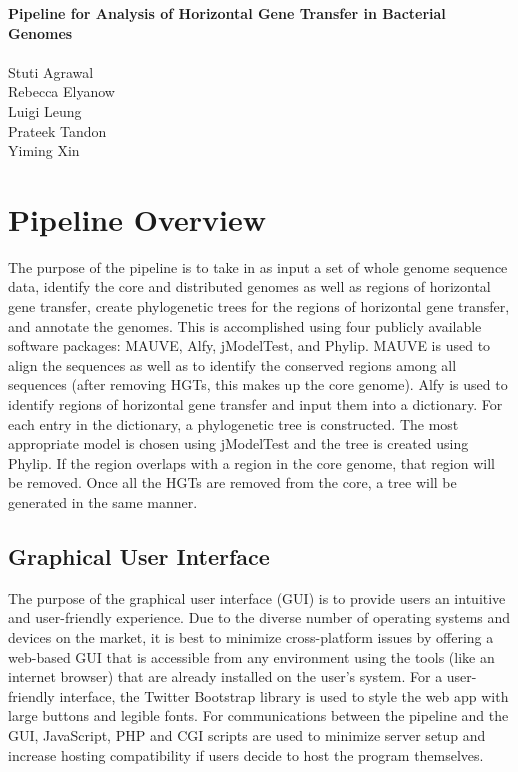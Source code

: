 \documentclass[12pt]{article}
\newcommand{\tab}{\hspace*{3em}}
\begin{document}
\begin{center}
\textbf{\LARGE{Pipeline for Analysis of Horizontal Gene Transfer in Bacterial Genomes}}\\
~~~\\
\Large{Stuti Agrawal}\\
\Large{Rebecca Elyanow}\\
\Large{Luigi Leung}\\
\Large{Prateek Tandon}\\
\Large{Yiming Xin}
\end{center}
\tableofcontents
\newpage
%

\section{Pipeline Overview}
\tab The purpose of the pipeline is to take in as input a set of whole genome sequence data, identify the core and distributed genomes as well as regions of horizontal gene transfer, create phylogenetic trees for the regions of horizontal gene transfer, and annotate the genomes. This is accomplished using four publicly available software packages: MAUVE, Alfy, jModelTest, and Phylip. MAUVE is used to align the sequences as well as to identify the conserved regions among all sequences (after removing HGTs, this makes up the core genome). Alfy is used to identify regions of horizontal gene transfer and input them into a dictionary. For each entry in the dictionary, a phylogenetic tree is constructed. The most appropriate model is chosen using jModelTest and the tree is created using Phylip. If the region overlaps with a region in the core genome, that region will be removed. Once all the HGTs are removed from the core, a tree will be generated in the same manner. 
\subsection{Graphical User Interface}
\tab The purpose of the graphical user interface (GUI) is to provide users an intuitive and user-friendly experience. Due to the diverse number of operating systems and devices on the market, it is best to minimize cross-platform issues by offering a web-based GUI that is accessible from any environment using the tools (like an internet browser) that are already installed on the user's system. For a user-friendly interface, the Twitter Bootstrap library is used to style the web app with large buttons and legible fonts. For communications between the pipeline and the GUI, JavaScript, PHP and CGI scripts are used to minimize server setup and increase hosting compatibility if users decide to host the program themselves.
\end{document}
